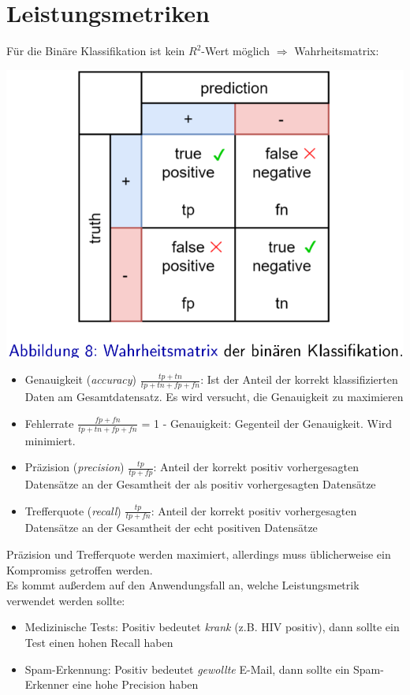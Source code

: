 \documentclass{report}
\begin{document}
\section{Leistungsmetriken}
Für die Binäre Klassifikation ist kein $R^2$-Wert möglich $\Rightarrow$ Wahrheitsmatrix:
\begin{center}
  \includegraphics[scale=.25]{ml03_7}
\end{center}
\vspace*{-1.25em}
\begin{itemize}
  \item Genauigkeit (\textit{accuracy}) $\frac{tp + tn}{tp + tn + fp + fn}$: Ist der Anteil der korrekt klassifizierten Daten am Gesamtdatensatz.
  Es wird versucht, die Genauigkeit zu maximieren
  \item Fehlerrate $\frac{fp + fn}{tp + tn + fp + fn}$ = 1 - Genauigkeit: Gegenteil der Genauigkeit. Wird minimiert.
  \item Präzision (\textit{precision}) $\frac{tp}{tp + fp}$: Anteil der korrekt positiv vorhergesagten Datensätze an der Gesamtheit der als positiv vorhergesagten Datensätze
  \item Trefferquote (\textit{recall}) $\frac{tp}{tp + fn}$: Anteil der korrekt positiv vorhergesagten Datensätze an der Gesamtheit der echt positiven Datensätze
\end{itemize}
Präzision und Trefferquote werden maximiert, allerdings muss üblicherweise ein Kompromiss getroffen werden.\\
Es kommt außerdem auf den Anwendungsfall an, welche Leistungsmetrik verwendet werden sollte:\\
\vspace*{-1.25em}
\begin{itemize}
  \item Medizinische Tests: Positiv bedeutet \textit{krank} (z.B. HIV positiv), dann sollte ein Test einen hohen Recall haben
  \item Spam-Erkennung: Positiv bedeutet \textit{gewollte} E-Mail, dann sollte ein Spam-Erkenner eine hohe Precision haben
\end{itemize}
\end{document}
